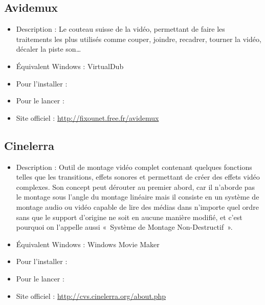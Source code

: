 \subsection{Avidemux}
\begin{itemize}
\begingroup
{}
\item Description : Le couteau suisse de la vidéo, permettant de faire les traitements les plus utilisés comme couper, joindre, recadrer, tourner la vidéo, décaler la piste son\ldots{}{\par}
\item Équivalent Windows : VirtualDub{\par}
\item Pour l'installer : 
\item Pour le lancer : 
\item Site officiel : \url{http://fixounet.free.fr/avidemux}{\par}
\endgroup
\end{itemize}
\subsection{Cinelerra}
\begin{itemize}
\begingroup
{}
\item Description : Outil de montage vidéo complet contenant quelques fonctions telles que les transitions, effets sonores et permettant de créer des effets vidéo complexes. Son concept peut dérouter au premier abord, car il n'aborde pas le montage sous l'angle du montage linéaire mais il consiste en un système de montage audio ou vidéo capable de lire des médias dans n'importe quel ordre sans que le support d'origine ne soit en aucune manière modifié, et c'est pourquoi on l'appelle aussi «~Système de Montage Non-Destructif~».{\par}
\endgroup
\item Équivalent Windows : Windows Movie Maker{\par}
\item Pour l'installer : 
\item Pour le lancer : 
\item Site officiel : \url{http://cvs.cinelerra.org/about.php}{\par}
\end{itemize}
